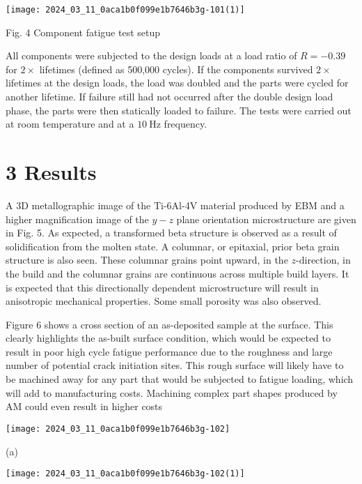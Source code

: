 \documentclass[10pt]{article}
\begin{document}
\begin{center}
\texttt{[image: 2024\_03\_11\_0aca1b0f099e1b7646b3g-101(1)]}
\end{center}

Fig. 4 Component fatigue test setup

All components were subjected to the design loads at a load ratio of $R=-0.39$ for $2 \times$ lifetimes (defined as 500,000 cycles). If the components survived $2 \times$ lifetimes at the design loads, the load was doubled and the parts were cycled for another lifetime. If failure still had not occurred after the double design load phase, the parts were then statically loaded to failure. The tests were carried out at room temperature and at a $10 \mathrm{~Hz}$ frequency.

\section*{3 Results}
A 3D metallographic image of the Ti-6Al-4V material produced by EBM and a higher magnification image of the $y-z$ plane orientation microstructure are given in Fig. 5. As expected, a transformed beta structure is observed as a result of solidification from the molten state. A columnar, or epitaxial, prior beta grain structure is also seen. These columnar grains point upward, in the $z$-direction, in the build and the columnar grains are continuous across multiple build layers. It is expected that this directionally dependent microstructure will result in anisotropic mechanical properties. Some small porosity was also observed.

Figure 6 shows a cross section of an as-deposited sample at the surface. This clearly highlights the as-built surface condition, which would be expected to result in poor high cycle fatigue performance due to the roughness and large number of potential crack initiation sites. This rough surface will likely have to be machined away for any part that would be subjected to fatigue loading, which will add to manufacturing costs. Machining complex part shapes produced by AM could even result in higher costs

\begin{center}
\texttt{[image: 2024\_03\_11\_0aca1b0f099e1b7646b3g-102]}
\end{center}

(a)

\begin{center}
\texttt{[image: 2024\_03\_11\_0aca1b0f099e1b7646b3g-102(1)]}
\end{center}
\end{document}
